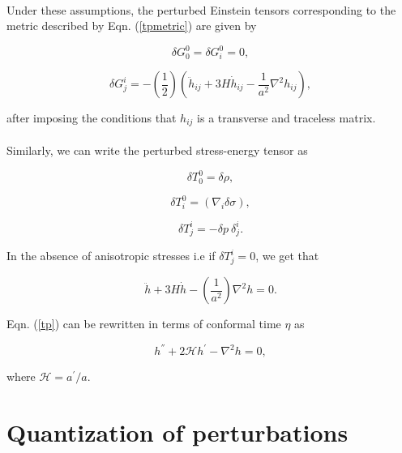 \documentclass[12pt,a4paper,oneside]{book}
\begin{document}
\paragraph*{} Under these assumptions, the perturbed Einstein tensors corresponding to the metric described 
by Eqn. (\ref{tpmetric}) are given by

\begin{equation}
\delta G^0_0 = \delta G^0_i = 0,
\end{equation}

\begin{equation}
\delta G^i_j = -\left(\frac{1}{2}\right)\left(\ddot{h}_{ij} + 3H\dot{h}_{ij} - \frac{1}{a^2}\nabla ^2h_{ij}\right),
\end{equation}

\noindent after imposing the conditions that $h_{ij}$ is a transverse and traceless matrix.

\paragraph*{} Similarly, we can write the perturbed stress-energy tensor as

\begin{equation}
\delta T^0_0 = \delta\rho,
\end{equation}

\begin{equation}
\delta T^0_i = \left(\nabla_i\delta\sigma\right),
\end{equation}

\begin{equation}
\delta T^i_j = -\delta p~\delta^i_j.
\end{equation}

\noindent In the absence of anisotropic stresses i.e if $\delta T^i_j = 0$, we get that

\begin{equation}\label{tp}
\ddot{h} + 3H\dot{h} - \left(\frac{1}{a^2}\right)\nabla ^2h = 0.
\end{equation}

\noindent Eqn. (\ref{tp}) can be rewritten in terms of conformal time $\eta$ as

\begin{equation}\label{tpn}
{h}^{''} + 2{\mathcal{H}}{h}^{'} - \nabla ^2h = 0,
\end{equation}

\noindent where ${\mathcal{H}} = a^{'}/a$.

\section{Quantization of perturbations}
\end{document}
